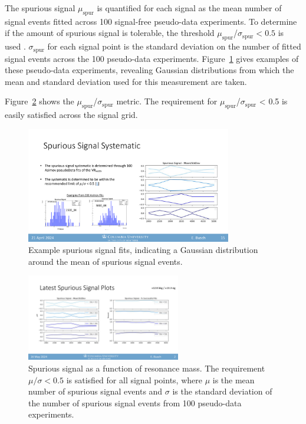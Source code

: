 The spurious signal $\mu_{\text{spur}}$ is quantified for each signal as the mean number of signal events fitted across 100 signal-free pseudo-data experiments. 
To determine if the amount of spurious signal is tolerable, the threshold $\mu_{\text{spur}}$/$\sigma_{\text{spur}} < 0.5$ is used \cite{smooth_bkg}.
$\sigma_{\text{spur}}$ for each signal point is the standard deviation on the number of fitted signal events across the 100 pseudo-data experiments.
Figure~\ref{fig:spursig_ex} gives examples of these pseudo-data experiments, revealing Gaussian distributions from which the mean and standard deviation used for this measurement are taken.

Figure~\ref{fig:spursig} shows the $\mu_{\text{spur}}$/$\sigma_{\text{spur}}$ metric.
The requirement for $\mu_{\text{spur}}$/$\sigma_{\text{spur}}$ < 0.5 is easily satisfied across the signal grid.
\begin{figure}[!htbp]
\centering
   \includegraphics[width=0.8\textwidth]{figures/systs/spursig_ex}
    \caption{Example spurious signal fits, indicating a Gaussian distribution around the mean of spurious signal events.
    \label{fig:spursig_ex}}
\end{figure}
\begin{figure}[!htbp]
\centering
   \includegraphics[width=0.6\textwidth]{figures/systs/spursig}
    \caption{Spurious signal as a function of resonance mass. The requirement $\mu/\sigma <0.5$ is satisfied for all signal points, where $\mu$ is the mean number of spurious signal events and $\sigma$ is the standard deviation of the number of spurious signal events from 100 pseudo-data experiments.
    \label{fig:spursig}}
\end{figure}


